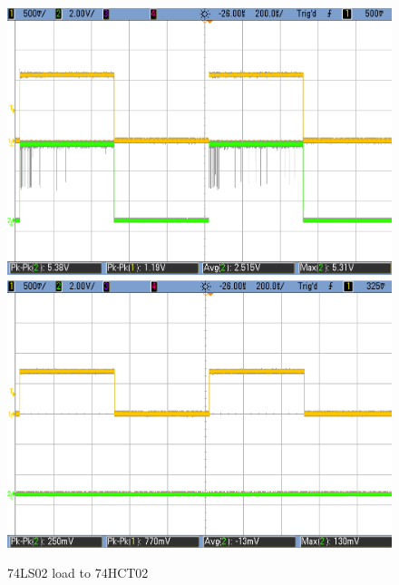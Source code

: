 \begin{figure}[h!]
        \includegraphics[scale=0.19]{LS-HCT-1p1V.png}\\
        \vspace{0.2cm}
        \includegraphics[scale=0.19]{LS-HCT-0p7V.png}
        \caption{\color{cyan}74LS02 load to 74HCT02}
        \label{fig:ej2exlstohct}
    \end{figure}

